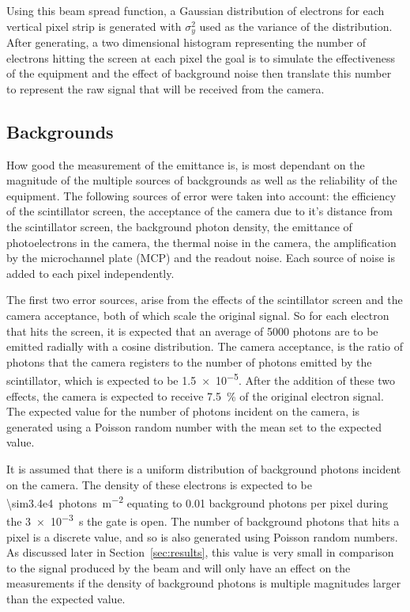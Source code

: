 Using this beam spread function, a Gaussian distribution of electrons for each
vertical pixel strip is generated with \(\sigma_y^2\) used as the variance of
the distribution.  After generating, a two dimensional histogram representing
the number of electrons hitting the screen at each pixel the goal is to simulate
the effectiveness of the equipment and the effect of background noise then
translate this number to represent the raw signal that will be received from the
camera.

\subsection{Backgrounds}

How good the measurement of the emittance is, is most dependant on the magnitude
of the multiple sources of backgrounds as well as the reliability of the
equipment. The following sources of error were taken into account: the
efficiency of the scintillator screen, the acceptance of the camera due to it's
distance from the scintillator screen, the background photon density, the
emittance of photoelectrons in the camera, the thermal noise in the camera, the
amplification by the microchannel plate (MCP) and the readout noise.  Each
source of noise is added to each pixel independently.


The first two error sources, arise from the effects of the scintillator screen
and the camera acceptance, both of which scale the original signal. So for each
electron that hits the screen, it is expected that an average of \num{5000}
photons are to be emitted radially with a cosine distribution. The camera
acceptance, is the ratio of photons that the camera registers to the number of
photons emitted by the scintillator, which is expected to be \num{1.5e-5}.
After the addition of these two effects, the camera is expected to receive
\SI{7.5}{\percent} of the original electron signal. The expected value for the
number of photons incident on the camera, is generated using a Poisson random
number with the mean set to the expected value.

It is assumed that there is a uniform distribution of background photons
incident on the camera. The density of these electrons is expected to be
\SI{\sim3.4e4}{photons\per\meter\squared} equating to \num{0.01} background
photons per pixel during the \SI{3e-3}{\second} the gate is open. The number of
background photons that hits a pixel is a discrete value, and so is also
generated using Poisson random numbers.  As discussed later in
Section~\ref{sec:results}, this value is very small in comparison to the signal
produced by the beam and will only have an effect on the measurements if the
density of background photons is multiple magnitudes larger than the expected
value.

